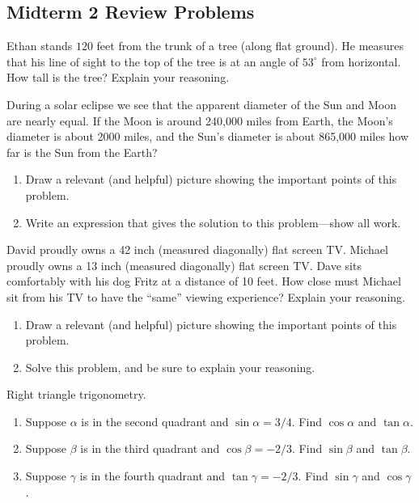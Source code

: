 \subsection{Midterm 2 Review Problems}

\begin{prob}
Ethan stands $120$ feet from the trunk of a tree (along flat ground).  He measures that his line of sight to the top of the tree is at an angle of $53^\circ$ from horizontal.  How tall is the tree?  Explain your reasoning.  
\end{prob}

\begin{prob}
During a solar eclipse we see that the apparent diameter of the Sun and Moon are nearly equal. If the Moon is around 240,000 miles from Earth, the Moon's diameter is about 2000 miles, and the Sun's diameter is about 865,000 miles how far is the Sun from the Earth?
\begin{enumerate}
\item Draw a relevant (and helpful) picture showing the important points of this problem.
\item Write an expression that gives the solution to this problem---show all work.
\end{enumerate}
\end{prob}

\begin{prob}
David proudly owns a 42 inch (measured diagonally) flat screen
  TV. Michael proudly owns a 13 inch (measured diagonally) flat screen
  TV. Dave sits comfortably with his dog Fritz at a distance of 10
  feet. How close must Michael sit from his TV to have the ``same''
  viewing experience?  Explain your reasoning.
\begin{enumerate}
\item Draw a relevant (and helpful) picture showing the important
  points of this problem.
\item Solve this problem, and be sure to explain your reasoning.
\end{enumerate}
\end{prob}

\begin{prob}
Right triangle trigonometry.  
\begin{enumerate}
\item Suppose $\alpha$ is in the second quadrant and $\sin\alpha = 3/4$.  Find $\cos\alpha$ and $\tan\alpha$.
\item Suppose $\beta$ is in the third quadrant and $\cos\beta = -2/3$.  Find $\sin\beta$ and $\tan\beta$.
\item Suppose $\gamma$ is in the fourth quadrant and $\tan\gamma = -2/3$.  Find $\sin\gamma$ and $\cos\gamma$.
\end{enumerate}
\end{prob}

